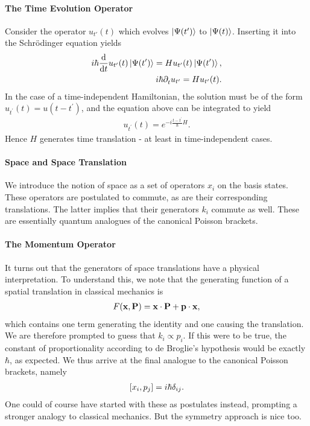 \paragraph{The Time Evolution Operator}
Consider the operator $u_{t'}(t)$ which evolves $\ket{\Psi(t')}$ to $\ket{\Psi(t)}$. Inserting it into the Schrödinger equation yields
\begin{align*}
	i\hbar\dv{t}u_{t^{\prime}}(t)\ket{\Psi(t^{\prime})} = Hu_{t^{\prime}}(t)\ket{\Psi(t^{\prime})}, \\
	i\hbar\partial_{t}^{}u_{t^{\prime}} = Hu_{t^{\prime}}(t).
\end{align*}
In the case of a time-independent Hamiltonian, the solution must be of the form $u_{t^{\prime}}(t) = u(t - t^{\prime})$, and the equation above can be integrated to yield
\begin{align*}
	u_{t^{\prime}}(t) = e^{-i\frac{t - t^{\prime}}{\hbar}H}.
\end{align*}
Hence $H$ generates time translation - at least in time-independent cases.

\paragraph{Space and Space Translation}
We introduce the notion of space as a set of operators $x_{i}$ on the basis states. These operators are postulated to commute, as are their corresponding translations. The latter implies that their generators $k_{i}$ commute as well. These are essentially quantum analogues of the canonical Poisson brackets.

\paragraph{The Momentum Operator}
It turns out that the generators of space translations have a physical interpretation. To understand this, we note that the generating function of a spatial translation in classical mechanics is
\begin{align*}
	F(\vb{x}, \vb{P}) = \vb{x}\cdot\vb{P} + \vb{p}\cdot\vb{x},
\end{align*}
which contains one term generating the identity and one causing the translation. We are therefore prompted to guess that $k_{i} \propto p_{i}$. If this were to be true, the constant of proportionality according to de Broglie's hypothesis would be exactly $\hbar$, as expected. We thus arrive at the final analogue to the canonical Poisson brackets, namely
\begin{align*}
	\comm{x_{i}}{p_{j}} = i\hbar\delta_{ij}.
\end{align*}
One could of course have started with these as postulates instead, prompting a stronger analogy to classical mechanics. But the symmetry approach is nice too.

